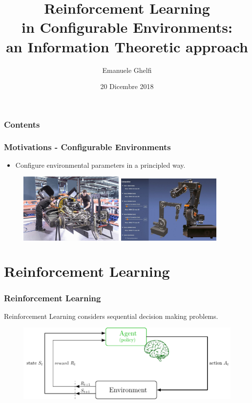 \documentclass[english,aspectratio=1610]{beamer}
\title[Reinforcement Learning in Configurable Environments]{Reinforcement Learning \\ in Configurable Environments: \\ an Information Theoretic approach}
\author[Emanuele Ghelfi]{Emanuele Ghelfi}
\institute[PoliMI]{Politecnico di Milano}
\date[20/12/2018]{20 Dicembre 2018}
\theoremstyle{mystyle}
\theoremstyle{mystyle}
\theoremstyle{mystyle}
\begin{document}
\frame{\titlepage}
\begin{frame}
\frametitle{Contents}
\tableofcontents
\end{frame}

\begin{frame}
	\frametitle{Motivations - Configurable Environments}
	\begin{itemize}
		\item Configure environmental parameters in a principled way.
	\end{itemize}
	\begin{figure}
		\includegraphics[width=0.46\textwidth]{pictures/conf-env}
		\hspace{1cm}
		\includegraphics[width=0.46\textwidth]{pictures/conf-env2}
	\end{figure}
\end{frame}

\section{Reinforcement Learning}
\begin{frame}
\frametitle{Reinforcement Learning}
Reinforcement Learning \citep{sutton_introduction} considers sequential decision making problems.
\begin{figure}
\centering
\includegraphics[width=1\textwidth]{pictures/agentenv_v2}
\end{figure}
\end{frame}
\end{document}
